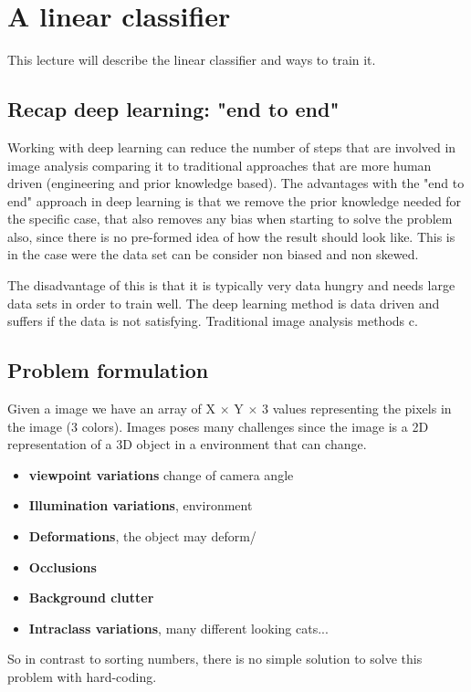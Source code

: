 \section{A linear classifier}
This lecture will describe the linear classifier and ways to train it. 

\subsection*{Recap deep learning: "end to end"}
Working with deep learning can reduce the number of steps that are involved in image analysis comparing it to traditional approaches that are more human driven (engineering and prior knowledge based). The advantages with the "end to end" approach in deep learning is that we remove the prior knowledge needed for the specific case, that also removes any bias when starting to solve the problem also, since there is no pre-formed idea of how the result should look like. This is in the case were the data set can be consider non biased and non skewed. 

The disadvantage of this is that it is typically very data hungry and needs large data sets in order to train well. The deep learning method is data driven and suffers if the data is not satisfying. Traditional image analysis methods c.


\subsection*{Problem formulation}
Given a image we have an array of X $\times$ Y $\times$ 3 values representing the pixels in the image (3 colors). Images poses many challenges since the image is a 2D representation of a 3D object in a environment that can change. 

	\begin{itemize}
	 	\item  \textbf{viewpoint variations} change of camera angle
	 	\item \textbf{Illumination variations}, environment  
	 	\item \textbf{Deformations}, the object may deform/
	 	\item \textbf{Occlusions} 
	 	\item \textbf{Background clutter}
	 	\item \textbf{Intraclass variations}, many different looking cats...
	 \end{itemize}

 So in contrast to sorting numbers, there is no simple solution to solve this problem with hard-coding. 


